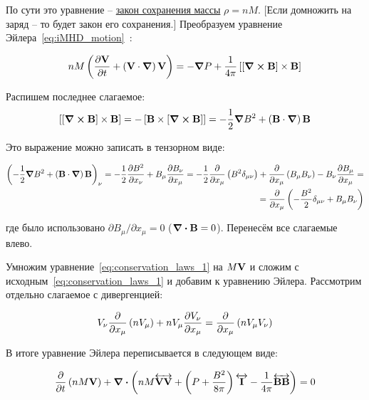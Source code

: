 \documentclass[10pt, a4paper]{article}
\begin{document}
По сути это уравнение -- \uline{закон сохранения массы} $\rho = nM$. [Если домножить на заряд -- то будет закон его сохранения.]
Преобразуем уравнение Эйлера~\eqref{eq:iMHD_motion}~\cite{kotelnikov}:

\begin{equation*}
	n M \left( \pdv{\vb{V}}{t} + \left( \vb{V}\cdot\grad \right)\vb{V} \right) = -\grad{P} + \frac{1}{4\pi}\left[\left[ \curl{\vb{B}} \right]\times\vb{B}\right]
\end{equation*}

Распишем последнее слагаемое:
\begin{equation*}
	\left[\left[ \curl{\vb{B}} \right]\times\vb{B}\right] = -\left[\vb{B}\times\left[ \curl{\vb{B}} \right]\right] = -\frac{1}{2}\grad{B^2} + \left( \vb{B} \cdot\grad \right)\vb{B}
\end{equation*}

Это выражение можно записать в тензорном виде:

\begin{equation*}
	\begin{split}
		\left( -\frac{1}{2}\grad{B^2} + \left( \vb{B} \cdot\grad \right)\vb{B} \right)_\nu = -\frac{1}{2}\pdv{B^2}{x_\nu} + B_\mu\pdv{B_\nu}{x_\mu}= -\frac{1}{2}\pdv{}{x_\mu}\left( B^2 \delta_{\mu\nu} \right) + \pdv{}{x_\mu}\left( B_\mu B_\nu \right) - B_\nu\pdv{B_\mu}{x_\mu} =\\= \pdv{}{x_\mu}\left( -\frac{B^2}{2} \delta_{\mu\nu} + B_\mu B_\nu \right)
	\end{split}
\end{equation*}

где было использовано $\partial B_\mu/\partial x_\mu = 0$ ($\div{\vb{B}}=0$). Перенесём все слагаемые влево.

Умножим уравнение~\eqref{eq:conservation_laws_1} на $M\vb{V}$ и сложим с исходным~\eqref{eq:conservation_laws_1} и добавим к уравнению Эйлера. Рассмотрим отдельно слагаемое с дивергенцией:

\begin{equation*}
	V_\nu \pdv{}{x_\mu}\left( nV_\mu \right) + nV_\mu\pdv{V_\nu}{x_\mu} = \pdv{}{x_\mu}\left( nV_\mu V_\nu \right)
\end{equation*}

В итоге уравнение Эйлера переписывается в следующем виде:

\begin{equation*}
	\pdv{}{t}\left( nM\vb{V} \right) + \div{\left( nM\overleftrightarrow{\vb{VV}} + \left( P + \frac{B^2}{8\pi} \right)\overleftrightarrow{\vb{I}} - \frac{1}{4\pi}\overleftrightarrow{\vb{BB}} \right)} = 0
\end{equation*}
\end{document}
